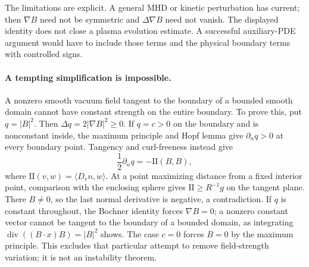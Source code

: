 The limitations are explicit. A general MHD or kinetic perturbation has current; then $\nabla B$ need not be symmetric and $\Delta\nabla B$ need not vanish. The displayed identity does not close a plasma evolution estimate. A successful auxiliary-PDE argument would have to include those terms and the physical boundary terms with controlled signs.

\paragraph{A tempting simplification is impossible.}
A nonzero smooth vacuum field tangent to the boundary of a bounded smooth domain cannot have constant strength on the entire boundary. To prove this, put $q=|B|^2$. Then $\Delta q=2|\nabla B|^2\ge0$. If $q=c>0$ on the boundary and is nonconstant inside, the maximum principle and Hopf lemma give $\partial_nq>0$ at every boundary point. Tangency and curl-freeness instead give
\[
\frac12\partial_nq=-\mathrm{II}(B,B),
\]
where $\mathrm{II}(v,w)=\langle D_vn,w\rangle$. At a point maximizing distance from a fixed interior point, comparison with the enclosing sphere gives $\mathrm{II}\ge R^{-1}g$ on the tangent plane. There $B\ne0$, so the last normal derivative is negative, a contradiction. If $q$ is constant throughout, the Bochner identity forces $\nabla B=0$; a nonzero constant vector cannot be tangent to the boundary of a bounded domain, as integrating $\operatorname{div}((B\cdot x)B)=|B|^2$ shows. The case $c=0$ forces $B=0$ by the maximum principle. This excludes that particular attempt to remove field-strength variation; it is not an instability theorem.
